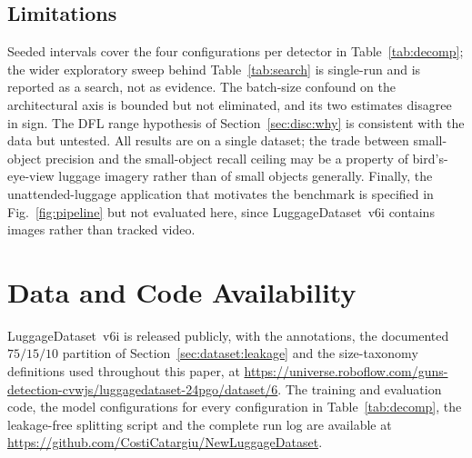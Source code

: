 \documentclass[10pt,twocolumn,a4paper]{article}
\begin{document}
\subsection{Limitations}

Seeded intervals cover the four configurations per detector in
Table~\ref{tab:decomp}; the wider exploratory sweep behind
Table~\ref{tab:search} is single-run and is reported as a search, not as
evidence. The batch-size confound on the architectural axis is
bounded but not eliminated, and its two estimates disagree in sign. The DFL
range hypothesis of Section~\ref{sec:disc:why} is consistent with the data but
untested. All results are on a single dataset; the trade between small-object
precision and the small-object recall ceiling may be a property of
bird's-eye-view luggage imagery rather than of small objects generally. Finally,
the unattended-luggage application that motivates the benchmark is specified in
Fig.~\ref{fig:pipeline} but not evaluated here, since LuggageDataset~v6i
contains images rather than tracked video.

\section*{Data and Code Availability}

LuggageDataset~v6i is released publicly, with the annotations, the documented
$75/15/10$ partition of Section~\ref{sec:dataset:leakage} and the size-taxonomy
definitions used throughout this paper, at
\url{https://universe.roboflow.com/guns-detection-cvwjs/luggagedataset-24pgo/dataset/6}.
The training and evaluation code, the model configurations for every
configuration in Table~\ref{tab:decomp}, the leakage-free splitting script and
the complete run log are available at
\url{https://github.com/CostiCatargiu/NewLuggageDataset}.



\balance
\end{document}

